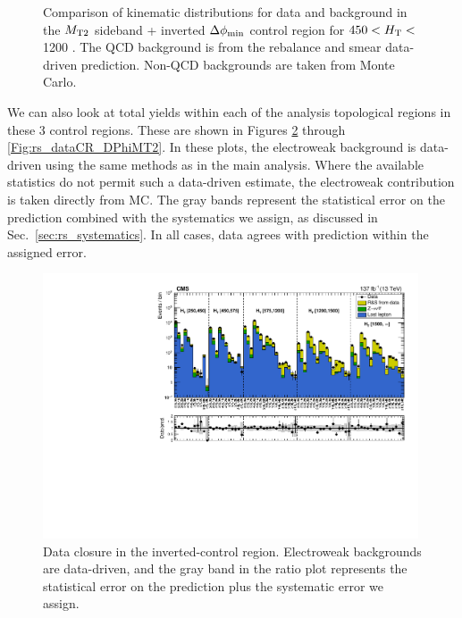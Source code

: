 \begin{figure}[!htbp]
\begin{center}
    \caption{Comparison of kinematic distributions for data and background in the $M_{\mathrm{T2}}$ sideband + inverted $\Delta\phi_{\mathrm{min}}$ control region for $450<H_{\mathrm{T}}<$ 1200 \GeV. The QCD background is from the
             rebalance and smear data-driven prediction. Non-QCD backgrounds are taken from Monte Carlo.
            }
    \label{Fig:rs_crRSDPhiMT2InclusiveHT450to1200}
  \end{center}
\end{figure}

\newpage
We can also look at total yields within each of the analysis topological regions in these 3 control regions. 
These are shown in Figures \ref{Fig:rs_dataCR_InvertDPhi} through \ref{Fig:rs_dataCR_DPhiMT2}.
In these plots, the electroweak background is data-driven using the same methods as in the main analysis.
Where the available statistics do not permit such a data-driven estimate, the electroweak contribution is taken directly from MC.
The gray bands represent the statistical error on the prediction combined with the systematics we assign, as discussed in Sec.~\ref{sec:rs_systematics}.
In all cases, data agrees with prediction within the assigned error.

\begin{figure}[htbp]
  \begin{center}
    \includegraphics[width=0.99\textwidth]{figs/qcd/rs_data/comp_InvertDPhi.pdf}
    \caption{Data closure in the inverted-\dpmin control region. Electroweak backgrounds are data-driven, and the gray band in the ratio plot represents the statistical error on the prediction plus the systematic error we assign.}
    \label{Fig:rs_dataCR_InvertDPhi}
  \end{center}
\end{figure}

